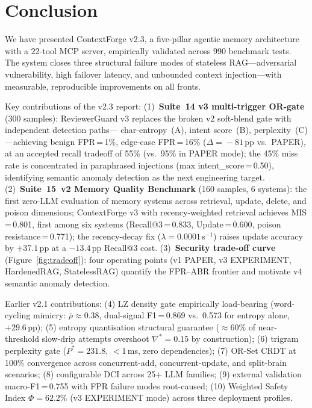 \documentclass[11pt,twocolumn]{article}
\begin{document}
\section{Conclusion}
\label{sec:conclusion}

We have presented ContextForge v2.3, a five-pillar agentic memory architecture
with a 22-tool MCP server, empirically validated across 990 benchmark tests.
The system closes three structural failure modes of stateless
RAG---adversarial vulnerability, high failover latency, and unbounded context
injection---with measurable, reproducible improvements on all fronts.

Key contributions of the v2.3 report:
(1)~\textbf{Suite~14 v3 multi-trigger OR-gate} (300 samples): ReviewerGuard v3
replaces the broken v2 soft-blend gate with independent detection paths---
char-entropy~(A), intent score~(B), perplexity~(C)---achieving benign
FPR\,=\,1\%, edge-case FPR\,=\,16\% ($\Delta\!=\!-81$\,pp vs.\ PAPER),
at an accepted recall tradeoff of 55\% (vs.\ 95\% in PAPER mode); the 45\%
miss rate is concentrated in paraphrased injections (max intent\_score\,=\,0.50),
identifying semantic anomaly detection as the next engineering target.
(2)~\textbf{Suite~15~v2 Memory Quality Benchmark} (160 samples, 6 systems):
the first zero-LLM evaluation of memory systems across retrieval, update,
delete, and poison dimensions; ContextForge v3 with recency-weighted retrieval
achieves MIS\,=\,0.801, first among six systems (Recall@3\,=\,0.833,
Update\,=\,0.600, poison resistance\,=\,0.771); the recency-decay fix
($\lambda=0.0001$\,s$^{-1}$) raises update accuracy by $+37.1$\,pp
at a $-13.4$\,pp Recall@3 cost.
(3)~\textbf{Security trade-off curve} (Figure~\ref{fig:tradeoff}):
four operating points (v1 PAPER, v3 EXPERIMENT, HardenedRAG, StatelessRAG)
quantify the FPR--ABR frontier and motivate v4 semantic anomaly detection.

Earlier v2.1 contributions: (4) LZ density gate empirically load-bearing
(word-cycling mimicry: $\bar{\rho}\approx 0.38$, dual-signal F1\,=\,0.869
vs.\ 0.573 for entropy alone, $+29.6$\,pp); (5) entropy quantisation
structural guarantee (${\approx}60\%$ of near-threshold slow-drip attempts
overshoot $\nabla^{*}=0.15$ by construction); (6) trigram perplexity gate
($P^{*}=231.8$, $<1$\,ms, zero dependencies); (7) OR-Set CRDT at 100\%
convergence across concurrent-add, concurrent-update, and split-brain
scenarios; (8) configurable DCI across 25+ LLM families; (9) external
validation macro-F1\,=\,0.755 with FPR failure modes root-caused;
(10) Weighted Safety Index $\Phi=62.2\%$ (v3 EXPERIMENT mode) across three
deployment profiles.
\end{document}
